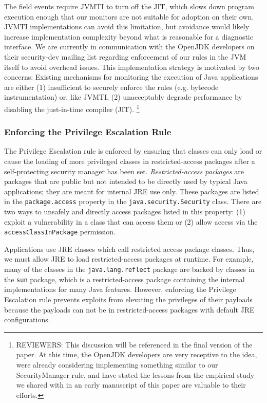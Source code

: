 \documentclass{sig-alternate}
\begin{document}
The field events require JVMTI to turn off the JIT, which slows down program
execution enough that our monitors are not suitable for adoption on their
own. JVMTI implementations can avoid this limitation, but avoidance would likely
increase implementation complexity beyond what is reasonable for a diagnostic
interface. We are currently in communication with the OpenJDK developers on
their security-dev mailing list regarding enforcement of our rules in the JVM
itself to avoid overhead issues.
 This implementation strategy is motivated by
two concerns: Existing mechanisms for monitoring the execution of Java
applications are either (1) insufficient to securely enforce the rules
(e.g. bytecode instrumentation) or, like JVMTI, (2) unacceptably degrade
performance by disabling the just-in-time compiler (JIT). 
\footnote{REVIEWERS: This discussion will be referenced in the final version of the paper. At this time, the OpenJDK developers are very receptive to the idea, were already considering implementing something similar to our SecurityManager rule, and have stated the lessons from the empirical study we shared with in an early manuscript of this paper are valuable to their efforts.}

\subsubsection{Enforcing the Privilege Escalation Rule}\label{sub:Enforcing-the-Privilege}

The Privilege Escalation rule is enforced by ensuring that classes
can only load or cause the loading of more privileged classes in restricted-access
packages after a self-protecting security manager has been set. \textit{Restricted-access
packages} are packages that are public but not intended to be directly
used by typical Java applications; they are meant for internal JRE
use only. These packages are listed in the \texttt{package.access}
property in the \texttt{java.security.Security} class. There are two
ways to unsafely and directly access packages listed in this property:
(1) exploit a vulnerability in a class that can access them or (2)
allow access via the \texttt{accessClassInPackage} permission.

Applications use JRE classes which call restricted access package
classes. Thus, we must allow JRE to load restricted-access packages
at runtime. For example, many of the classes in the \texttt{java.lang.reflect}
package are backed by classes in the \texttt{sun} package, which is
a restricted-access package containing the internal implementations
for many Java features. However, enforcing the Privilege Escalation
rule prevents exploits from elevating the privileges of their payloads
because the payloads can not be in restricted-access packages with
default JRE configurations. 
\end{document}
